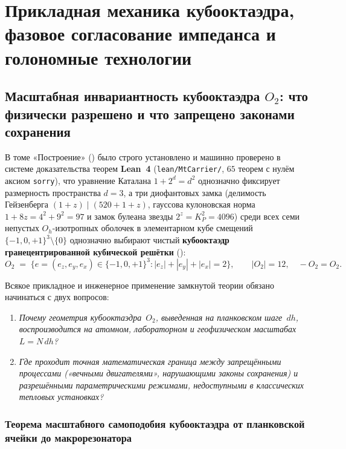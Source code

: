 \part{Прикладная механика кубооктаэдра, фазовое согласование импеданса и голономные технологии}

\chapter{Масштабная инвариантность кубооктаэдра \texorpdfstring{$O_2$}{O\_2}: что физически разрешено и что запрещено законами сохранения}
\label{ch:applied-scale-invariance-and-bounds}

В томе «Построение» () было строго установлено и машинно проверено в системе доказательства теорем \textbf{Lean~4} (\texttt{lean/MtCarrier/}, $65$ теорем с нулём аксиом \texttt{sorry}), что уравнение Каталана $1 + 2^d = d^2$ однозначно фиксирует размерность пространства $d = 3$, а три диофантовых замка (делимость Гейзенберга $(1+z)\mid(520+1+z)$, гауссова кулоновская норма $1+8z = 4^2+9^2 = 97$ и замок булеана звезды $2^z = K_P^2 = 4096$) среди всех семи непустых $O_h$-изотропных оболочек в элементарном кубе смещений $\{-1,0,+1\}^3\setminus\{0\}$ однозначно выбирают чистый \textbf{кубооктаэдр гранецентрированной кубической решётки} (\latGCKshort):
\begin{equation}
\label{eq:applied-cuboctahedron-shell}
  O_2 \;=\; \bigl\{e = (e_z, e_y, e_x)\in\{-1,0,+1\}^3 : |e_z| + |e_y| + |e_x| = 2\bigr\},
  \qquad |O_2| = 12,\quad -O_2 = O_2.
\end{equation}

Всякое прикладное и инженерное применение замкнутой теории обязано начинаться с двух вопросов:
\begin{enumerate}[nosep,leftmargin=*]
\item \emph{Почему геометрия кубооктаэдра~$O_2$, выведенная на планковском шаге~$dh$, воспроизводится на атомном, лабораторном и геофизическом масштабах $L = N\,dh$?}
\item \emph{Где проходит точная математическая граница между запрещёнными процессами («вечными двигателями», нарушающими законы сохранения) и разрешёнными параметрическими режимами, недоступными в классических тепловых установках?}
\end{enumerate}

\section{Теорема масштабного самоподобия кубооктаэдра от планковской ячейки до макрорезонатора}
\label{sec:applied-self-similarity}

